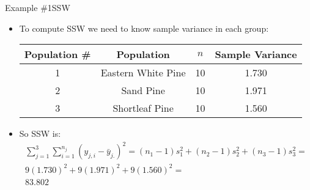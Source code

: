 \documentclass[xcolor=dvipsnames]{beamer}
\begin{document}
\begin{frame}{Example \#1}{SSW}
	\begin{itemize}
	\item To compute SSW we need to know sample variance in each group: \pause
		\begin{center}
			\begin{tabular}{|c|c|c|c|}
				\hline
				\textbf{Population \#} & \textbf{Population} & $n$ & \textbf{Sample Variance} \\
				\hline \hline
				1  & Eastern White Pine    &   10 &  1.730 \\ \hline 
				2 &  Sand Pine              & 10 &   1.971\\ \hline 
				3 &  Shortleaf Pine        &  10 &   1.560\\ \hline 
			\end{tabular}
		\end{center}\pause
				\vspace{2mm}
	\item So SSW is:\pause
	\begin{gather*}
		\sum_{j=1}^{3}\sum_{i = 1}^{n_j} (y_{j,i}-\bar{y}_{j.})^2 = (n_1-1)s_1^2 + (n_2-1)s_2^2 + (n_3-1)s_3^2 =\\ 
		9(1.730)^2 + 9(1.971)^2 + 9(1.560)^2 = \\
		83.802
	\end{gather*}
	\end{itemize}
\end{frame}
\end{document}
